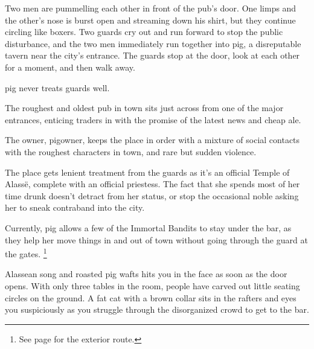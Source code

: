 \begin{multicols}{2}
\setcounter{list}{0}

\begin{boxtext}

  Two men are pummelling each other in front of the pub's door.
   One limps and the other's nose is burst open and streaming down his shirt, but they continue circling like boxers.
   Two guards cry out and run forward to stop the public disturbance, and the two men immediately run together into \gls{pig}, a disreputable tavern near the city's entrance.
   The guards stop at the door, look at each other for a moment, and then walk away.

\Gls{pig} never treats \glspl{guard} well.

\end{boxtext}
 
The roughest and oldest pub in \gls{town} sits just across from one of the major entrances, enticing traders in with the promise of the latest news and cheap ale.

The owner, \gls{pigowner}, keeps the place in order with a mixture of social contacts with the roughest characters in \gls{town}, and rare but sudden violence.

The place gets lenient treatment from the guards as it's an official Temple of Alass\"{e}, complete with an official priestess.
The fact that she spends most of her time drunk doesn't detract from her status, or stop the occasional noble asking her to sneak contraband into the city.

Currently, \gls{pig} allows a few of the Immortal Bandits to stay under the bar, as they help her move things in and out of town without going through the \gls{guard} at the gates.%
\footnote{See page \pageref{farmExit} for the exterior route.}


\label{pigStreet}

\label{pigHall}

\begin{boxtext}

  Alassean song and roasted pig wafts hits you in the face as soon as the door opens.
  With only three tables in the room, people have carved out little seating circles on the ground.
  A fat cat with a brown collar sits in the rafters and eyes you suspiciously as you struggle through the disorganized crowd to get to the bar.


\end{boxtext}
\end{multicols}
